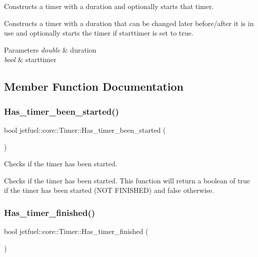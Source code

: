 Constructs a timer with a duration and optionally starts that timer. 

Constructs a timer with a duration that can be changed later before/after it is in use and optionally starts the timer if starttimer is set to true.


\begin{DoxyParams}{Parameters}
{\em double} & duration \\
\hline
{\em bool} & starttimer \\
\hline
\end{DoxyParams}


\subsection{Member Function Documentation}
\mbox{\label{classjetfuel_1_1core_1_1Timer_a6442806833e30cc94d6c17dd91243c57}} 
\subsubsection{\texorpdfstring{Has\+\_\+timer\+\_\+been\+\_\+started()}{Has\_timer\_been\_started()}}
{\footnotesize\ttfamily bool jetfuel\+::core\+::\+Timer\+::\+Has\+\_\+timer\+\_\+been\+\_\+started (\begin{DoxyParamCaption}{ }\end{DoxyParamCaption})\hspace{0.3cm}{\ttfamily [inline]}}



Checks if the timer has been started. 

Checks if the timer has been started. This function will return a boolean of true if the timer has been started (N\+OT F\+I\+N\+I\+S\+H\+ED) and false otherwise. \mbox{\label{classjetfuel_1_1core_1_1Timer_a8d6efef6a9e6aae8156fd1f8dce5f403}} 
\subsubsection{\texorpdfstring{Has\+\_\+timer\+\_\+finished()}{Has\_timer\_finished()}}
{\footnotesize\ttfamily bool jetfuel\+::core\+::\+Timer\+::\+Has\+\_\+timer\+\_\+finished (\begin{DoxyParamCaption}{ }\end{DoxyParamCaption})\hspace{0.3cm}{\ttfamily [inline]}}



